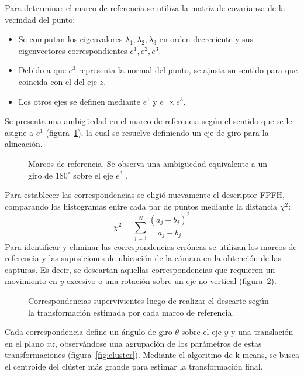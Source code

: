 		Para determinar el marco de referencia se utiliza la matriz de covarianza de la vecindad del punto:
		\begin{itemize}
			\item Se computan los eigenvalores ${\lambda_1, \lambda_2, \lambda_3}$ en orden decreciente y sus eigenvectores correspondientes
				$e^{1}, e^{2}, e^{3}$.
			\item Debido a que $e^{3}$ representa la normal del punto, se ajusta su sentido para que coincida con el del eje $z$.
			\item Los otros ejes se definen mediante $e^{1}$ y $e^{1} \times e^{3}$.
		\end{itemize}
		Se presenta una ambigüedad en el marco de referencia según el sentido que se le asigne a $e^{1}$ (figura~\ref{fig:marco_referencia_iss}),
		la cual se resuelve definiendo un eje de giro para la alineación.

		\begin{figure}
			\caption[Marcos de referencia]{\label{fig:marco_referencia_iss}Marcos de referencia. Se observa una ambigüedad equivalente a un giro de $180^{\circ}$ sobre el eje $e^{3}$ .}
		\end{figure}

		Para establecer las correspondencias se eligió nuevamente el descriptor FPFH,
		comparando los histogramas entre cada par de puntos mediante la distancia $\chi^2$:
		\[ \chi^2 = \sum_{j=1}^{N} \frac{\left(a_j - b_j\right)^2}{a_j + b_j} \]
		Para identificar y eliminar las correspondencias erróneas se utilizan
		los marcos de referencia y las suposiciones de ubicación de la cámara
		en la obtención de las capturas.  Es decir, se descartan aquellas correspondencias que
		requieren un movimiento en $y$ excesivo o una rotación sobre un eje no vertical (figura~\ref{fig:bun_corr}).

		\begin{figure}
			\centering
			\caption{\label{fig:bun_corr}Correspondencias supervivientes luego de realizar el descarte según la transformación estimada por cada marco de referencia.}
		\end{figure}

		Cada correspondencia define un ángulo de giro $\theta$ sobre
		el eje $y$ y una translación en el plano $xz$, observándose una agrupación
		de los parámetros de estas transformaciones (figura~\ref{fig:cluster}).
		Mediante el algoritmo de k-means, se busca el centroide del clúster más grande
		para estimar la transformación final.

